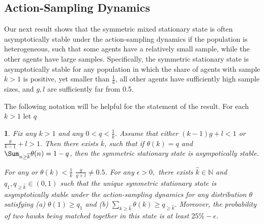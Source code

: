 \documentclass[12pt]{article}
\numberwithin{equation}{section}
\numberwithin{figure}{section}
\theoremstyle{definition}
\theoremstyle{plain}
\theoremstyle{plain}
\theoremstyle{plain}
\newtheorem{thm}{\protect\theoremname}
\theoremstyle{remark}
\theoremstyle{plain}
\theoremstyle{plain}
\providecommand{\theoremname}{Theorem}
\begin{document}
\subsection{Action-Sampling
Dynamics\label{subsec:Instability-of-symemtric-action-dyanmics}}
Our next result shows that the symmetric mixed stationary state is often asymptotically stable under the action-sampling dynamics if the population is heterogeneous, such that some agents have a relatively small sample, while the other agents have large samples.
Specifically, the symmetric stationary state is asymptotically stable for any population in which the share of agents with sample $k>1$ is positive, yet smaller than  $\frac{1}{k}$, all other agents have sufficiently high sample sizes, and $g,l$ are sufficiently far from 0.5.

The following notation will be helpful for the statement of the result. For each $k>1$ let $q$

\begin{thm}\label{thm:stableinterior_ASD}
Fix any $k>1$ and any $0<q<\frac{1}{k}.$ Assume that either $(k-1)g+l<1$ or $\frac{g}{k-1}+l>1.$ Then there exists $\overline k$, such that if $\theta(k)=q$ and $\Sum_{n\geq\overline{k}}\theta(n)=1-q$, then the symmetric stationary state is asympotically stable.

For any  or $\theta(k)<\frac{1}{k}$
$\frac{g}{g+l}\neq0.5$. For any $\epsilon>0,$ there exists $\hat{k}\in\mathbb{N}$ and $q_1, q_{\geq{\hat k}} \in (0,1)$ such that the unique symmetric stationary state is asymptotically stable under the action-sampling dynamics for any distribution $\theta$ satisfying (a) $\theta(1)\geq q_1$ and (b) $\sum_{k\geq\hat{k}}\theta\left(k\right)\geq q_{\geq{\hat k}}.$ Moreover, the probability of two hawks being matched together in this state is at least $25\% - \epsilon$.

\end{thm}
\end{document}
